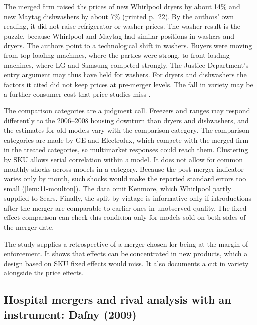  The merged firm raised the prices of new Whirlpool dryers by about 14\% and new Maytag
dishwashers by about 7\% (printed p.~22). By the authors' own reading, it did not raise refrigerator or washer
prices. The washer result is the puzzle, because Whirlpool and Maytag had
similar positions in washers and dryers. The authors point to a technological shift in washers. Buyers were moving
from top-loading machines, where the parties were strong, to front-loading machines, where LG and Samsung competed
strongly. The Justice Department's entry argument may thus have held for washers. For dryers and dishwashers the
factors it cited did not keep prices at pre-merger levels. The fall in variety may be a further consumer cost that
price studies miss \citep{BerryWaldfogel2001,Sweeting2010}.

 The comparison categories are a judgment call. Freezers and ranges may respond differently
to the 2006--2008 housing downturn than dryers and dishwashers, and the estimates for old models vary with the
comparison category. The comparison categories are made by GE and Electrolux, which compete with the merged firm in
the treated categories, so multimarket responses could reach them. Clustering by SKU allows serial correlation
within a model. It does not allow for common monthly shocks across models in a category. Because the post-merger indicator varies
only by month, such shocks would make the reported standard errors too small (\cref{lem:11-moulton}). The data
omit Kenmore, which Whirlpool partly supplied to Sears. Finally, the split by vintage is informative only if
introductions after the merger are comparable to earlier ones in unobserved quality. The fixed-effect comparison can
check this condition only for models sold on both sides of the merger date.

 The study supplies a retrospective of a merger chosen for being at the margin of
enforcement. It shows that effects can be concentrated in new products, which a design based on SKU fixed effects
would miss. It also documents a cut in variety alongside the price effects.

\subsection{Hospital mergers and rival analysis with an instrument: Dafny (2009)}\label{sec:11-dafny}

